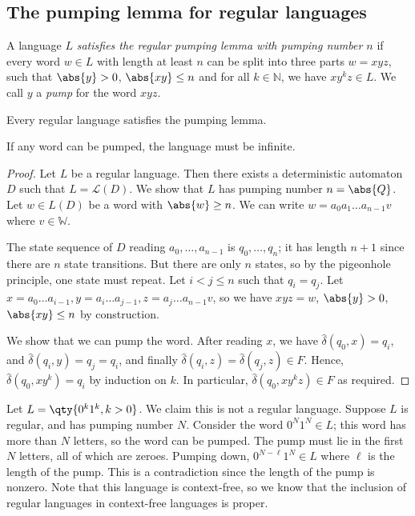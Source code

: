 \subsection{The pumping lemma for regular languages}
\begin{definition}
	A language \( L \) \emph{satisfies the regular pumping lemma with pumping number \( n \)} if every word \( w \in L \) with length at least \( n \) can be split into three parts \( w = x y z \), such that \( \abs{y} > 0 \), \( \abs{xy} \leq n \) and for all \( k \in \mathbb N \), we have \( xy^kz \in L \).
	We call \( y \) a \emph{pump} for the word \( x y z \).
\end{definition}
\begin{theorem}
	Every regular language satisfies the pumping lemma.
\end{theorem}
\begin{remark}
	If any word can be pumped, the language must be infinite.
\end{remark}
\begin{proof}
	Let \( L \) be a regular language.
	Then there exists a deterministic automaton \( D \) such that \( L = \mathcal L(D) \).
	We show that \( L \) has pumping number \( n = \abs{Q} \).
	Let \( w \in L(D) \) be a word with \( \abs{w} \geq n \).
	We can write \( w = a_0a_1 \dots a_{n-1} v \) where \( v \in \mathbb W \).

	The state sequence of \( D \) reading \( a_0, \dots, a_{n-1} \) is \( q_0, \dots, q_n \); it has length \( n + 1 \) since there are \( n \) state transitions.
	But there are only \( n \) states, so by the pigeonhole principle, one state must repeat.
	Let \( i < j \leq n \) such that \( q_i = q_j \).
	Let \( x = a_0 \dots a_{i-1}, y = a_i \dots a_{j-1}, z = a_j \dots a_{n-1} v \), so we have \( xyz = w \), \( \abs{y} > 0 \), \( \abs{xy} \leq n \) by construction.

	We show that we can pump the word.
	After reading \( x \), we have \( \hat\delta(q_0, x) = q_i \), and \( \hat\delta(q_i, y) = q_j = q_i \), and finally \( \hat\delta(q_i, z) = \hat\delta(q_j, z) \in F \).
	Hence, \( \hat\delta(q_0, xy^k) = q_i \) by induction on \( k \).
	In particular, \( \hat\delta(q_0, xy^kz) \in F \) as required.
\end{proof}
\begin{example}
	Let \( L = \qty{0^k 1^k, k > 0} \).
	We claim this is not a regular language.
	Suppose \( L \) is regular, and has pumping number \( N \).
	Consider the word \( 0^N 1^N \in L \); this word has more than \( N \) letters, so the word can be pumped.
	The pump must lie in the first \( N \) letters, all of which are zeroes.
	Pumping down, \( 0^{N-\ell} 1^N \in L \) where \( \ell \) is the length of the pump.
	This is a contradiction since the length of the pump is nonzero.
	Note that this language is context-free, so we know that the inclusion of regular languages in context-free languages is proper.
\end{example}

